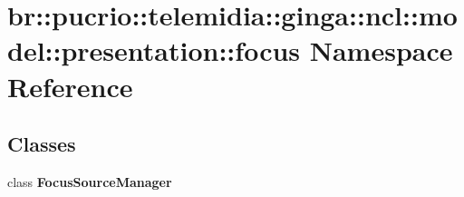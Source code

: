 \section{br::pucrio::telemidia::ginga::ncl::model::presentation::focus Namespace Reference}
\label{namespacebr_1_1pucrio_1_1telemidia_1_1ginga_1_1ncl_1_1model_1_1presentation_1_1focus}


\subsection*{Classes}
\begin{CompactItemize}
\item 
class {\bf FocusSourceManager}
\end{CompactItemize}
